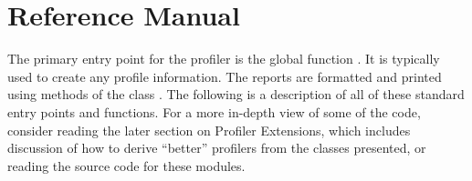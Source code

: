 \section{Reference Manual}

\renewcommand{\indexsubitem}{(profiler function)}

The primary entry point for the profiler is the global function
.  It is typically used to create any profile
information.  The reports are formatted and printed using methods of
the class .  The following is a description of all
of these standard entry points and functions.  For a more in-depth
view of some of the code, consider reading the later section on
Profiler Extensions, which includes discussion of how to derive
``better'' profilers from the classes presented, or reading the source
code for these modules.

